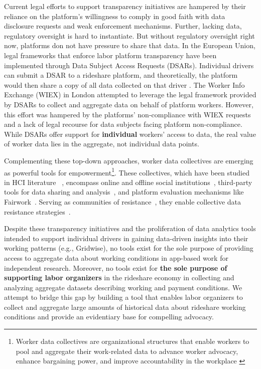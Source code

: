 Current legal efforts to support transparency initiatives are hampered by their reliance on the platform's willingness to comply in good faith with data disclosure requests and weak enforcement mechanisms. Further, lacking data, regulatory oversight is hard to instantiate. But without regulatory oversight right now, platforms don not have pressure to share that data. In the European Union, legal frameworks that enforce labor platform transparency have been implemented through Data Subject Access Requests (DSARs). Individual drivers can submit a DSAR to a rideshare platform, and theoretically, the platform would then share a copy of all data collected on that driver \cite{ausloos2018shattering, mahieu2020recognising}. The Worker Info Exchange (WIEX) in London attempted to leverage the legal framework provided by DSARs to collect and aggregate data on behalf of platform workers. However, this effort was hampered by the platforms' non-compliance with WIEX requests and a lack of legal recourse for data subjects facing platform non-compliance. While DSARs offer support for \textbf{individual} workers' access to data, the real value of worker data lies in the aggregate, not individual data points.

Complementing these top-down approaches, worker data collectives are emerging as powerful tools for empowerment\footnote{Worker data collectives are organizational structures that enable workers to pool and aggregate their work-related data to advance worker advocacy, enhance bargaining power, and improve accountability in the workplace \cite{hsieh2024worker}}. These collectives, which have been studied in HCI literature~\cite{imaginaries,uuapp,codesign} \cite{ zhang2024data}, encompass online and offline social institutions~\cite{atomized,la_strikes}, third-party tools for data sharing and analysis~\cite{uuapp,codesign,probes,self_track,sousveillance}, and platform evaluation mechanisms like Fairwork~\cite{fairwork}. Serving as communities of resistance~\cite{critique}, they enable collective data resistance strategies~\cite{leverage,refusal,strikes}.

Despite these transparency initiatives and the proliferation of data analytics tools intended to support individual drivers in gaining data-driven insights into their working patterns (e.g., Gridwise), no tools exist for the sole purpose of providing access to aggregate data about working conditions in app-based work for independent research. Moreover, no tools exist for \textbf{the sole purpose of supporting labor organizers} in the rideshare economy in collecting and analyzing aggregate datasets describing working and payment conditions. We attempt to bridge this gap by building a tool that enables labor organizers to collect and aggregate large amounts of historical data about rideshare working conditions and provide an evidentiary base for compelling advocacy.

